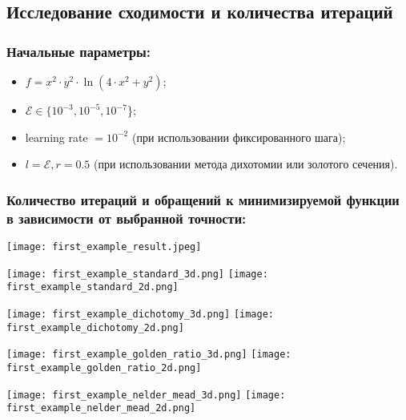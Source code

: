 \documentclass{article}
\begin{document}
\subsection*{Исследование сходимости и количества итераций}
\subsubsection*{Начальные параметры:}
\begin{itemize}
    \item $f = x^2 \cdot y^2 \cdot \ln{(4 \cdot x^2 + y^2)}$;
    \item $\mathcal{E} \in \{10^{-3}, 10^{-5}, 10^{-7}$\};
    \item learning rate $= 10^{-2}$ (при использовании фиксированного шага);
    \item $l = \mathcal{E}, r = 0.5$ (при использовании метода дихотомии или золотого сечения).
\end{itemize}
\subsubsection*{Количество итераций и обращений к минимизируемой функции в зависимости от выбранной точности:} 

\texttt{[image: first\_example\_result.jpeg]}

\newpage
\begin{center}
    \texttt{[image: first\_example\_standard\_3d.png]}
    \texttt{[image: first\_example\_standard\_2d.png]}
    \label{fig:enter-label}
\end{center}
\begin{center}
    \texttt{[image: first\_example\_dichotomy\_3d.png]}
    \texttt{[image: first\_example\_dichotomy\_2d.png]}
    \label{fig:enter-label}
\end{center}
\begin{center}
    \texttt{[image: first\_example\_golden\_ratio\_3d.png]}
    \texttt{[image: first\_example\_golden\_ratio\_2d.png]}
    \label{fig:enter-label}
\end{center}
\begin{center}
    \texttt{[image: first\_example\_nelder\_mead\_3d.png]}
    \texttt{[image: first\_example\_nelder\_mead\_2d.png]}
    \label{fig:enter-label}
\end{center}
\end{document}
